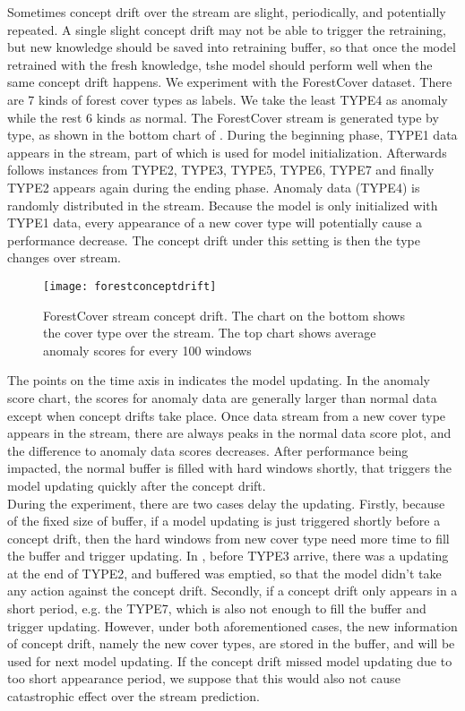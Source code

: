 Sometimes concept drift over the stream are slight, periodically, and potentially repeated. A single slight concept drift may not be able to trigger the retraining, but new knowledge should be saved into retraining buffer, so that once the model retrained with the fresh knowledge, tshe model should perform well when the same concept drift happens. We experiment with the ForestCover dataset. There are 7 kinds of forest cover types as labels. We take the least TYPE4 as anomaly while the rest 6 kinds as normal. The ForestCover stream is generated type by type, as shown in the bottom chart of . During the beginning phase, TYPE1 data appears in the stream, part of which is used for model initialization. Afterwards follows instances from TYPE2, TYPE3, TYPE5, TYPE6, TYPE7 and finally TYPE2 appears again during the ending phase. Anomaly data (TYPE4) is randomly distributed in the stream. Because the model is only initialized with TYPE1 data, every appearance of a new cover type will potentially cause a performance decrease. The concept drift under this setting is then the type changes over stream. \\

\begin{figure}[h]
\centering
\texttt{[image: forestconceptdrift]}
\caption[ForestCover stream concept drift]{ ForestCover stream concept drift. The chart on the bottom shows the cover type over the stream. The top chart shows average anomaly scores for every 100 windows}
\label{fig:fcd}
\end{figure}

The points on the time axis in  indicates the model updating. In the anomaly score chart, the scores for anomaly data are generally larger than normal data except when concept drifts take place. Once data stream from a new cover type appears in the stream, there are always peaks in the normal data score plot, and the difference to anomaly data scores decreases. After performance being impacted, the normal buffer is filled with hard windows shortly, that triggers the model updating quickly after the concept drift. \\

During the experiment, there are two cases delay the updating. Firstly, because of the fixed size of buffer, if a model updating is just triggered shortly before a concept drift, then the hard windows from new cover type need more time to fill the buffer and trigger updating. In , before TYPE3 arrive, there was a updating at the end of TYPE2, and buffered was emptied, so that the model didn’t take any action against the concept drift. Secondly, if a concept drift only appears in a short period, e.g. the TYPE7, which is also not enough to fill the buffer and trigger updating. However, under both aforementioned cases, the new information of concept drift, namely the new cover types, are stored in the buffer, and will be used for next model updating. If the concept drift missed model updating due to too short appearance period, we suppose that this would also not cause catastrophic effect over the stream prediction.\\


